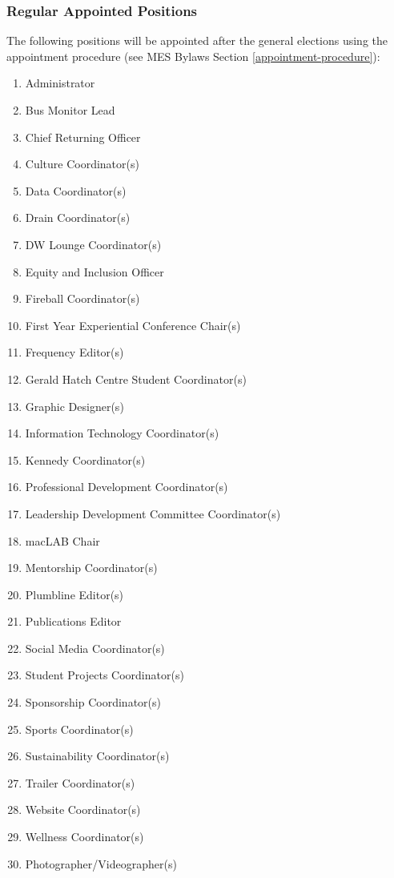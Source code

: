 \subsubsection{Regular Appointed Positions}
\label{regular-appointed-positions}
The following positions will be appointed after the general elections
using the appointment procedure (see MES Bylaws Section \ref{appointment-procedure}): %

\begin{enumerate}
 \item
  Administrator
 \item
  Bus Monitor Lead
 \item
  Chief Returning Officer
 \item
  Culture Coordinator(s)
 \item
  Data Coordinator(s)
 \item
  Drain Coordinator(s)
 \item
  DW Lounge Coordinator(s)
 \item
  Equity and Inclusion Officer
 \item
  Fireball Coordinator(s)
 \item
  First Year Experiential Conference Chair(s)
 \item
  Frequency Editor(s)
 \item
  Gerald Hatch Centre Student Coordinator(s)
 \item
  Graphic Designer(s)
 \item
  Information Technology Coordinator(s)
 \item
  Kennedy Coordinator(s)
 \item
  Professional Development Coordinator(s)
 \item
  Leadership Development Committee Coordinator(s)
 \item
  macLAB Chair
 \item
  Mentorship Coordinator(s)
 \item
  Plumbline Editor(s)
 \item
  Publications Editor
 \item
  Social Media Coordinator(s)
 \item
  Student Projects Coordinator(s)
 \item
  Sponsorship Coordinator(s)
 \item
  Sports Coordinator(s)
 \item
  Sustainability Coordinator(s)
 \item
  Trailer Coordinator(s)
 \item
  Website Coordinator(s)
 \item
  Wellness Coordinator(s)
 \item
  Photographer/Videographer(s)
\end{enumerate}

